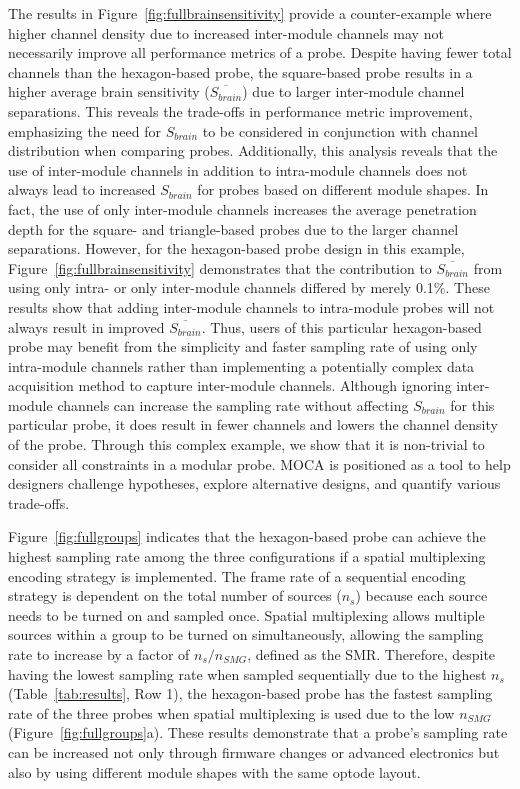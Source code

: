 The results in Figure~\ref{fig:fullbrainsensitivity} provide a counter-example where higher channel density due to increased inter-module channels may not necessarily improve all performance metrics of a probe. Despite having fewer total channels than the hexagon-based probe, the square-based probe results in a higher average brain sensitivity ($\overline{S_{brain}}$) due to larger inter-module channel separations. This reveals the trade-offs in performance metric improvement, emphasizing the need for $S_{brain}$ to be considered in conjunction with channel distribution when comparing probes. Additionally, this analysis reveals that the use of inter-module channels in addition to intra-module channels does not always lead to increased $S_{brain}$ for probes based on different module shapes. In fact, the use of only inter-module channels increases the average penetration depth for the square- and triangle-based probes due to the larger channel separations. However, for the hexagon-based probe design in this example, Figure~\ref{fig:fullbrainsensitivity} demonstrates that the contribution to $\overline{S_{brain}}$ from using only intra- or only inter-module channels differed by merely 0.1\%. These results show that adding inter-module channels to intra-module probes will not always result in improved $\overline{S_{brain}}$. Thus, users of this particular hexagon-based probe may benefit from the simplicity and faster sampling rate of using only intra-module channels rather than implementing a potentially complex data acquisition method to capture inter-module channels. Although ignoring inter-module channels can increase the sampling rate without affecting $S_{brain}$ for this particular probe, it does result in fewer channels and lowers the channel density of the probe. Through this complex example, we show that it is non-trivial to consider all constraints in a modular probe. \ac{MOCA} is positioned as a tool to help designers challenge hypotheses, explore alternative designs, and quantify various trade-offs.

Figure~\ref{fig:fullgroups} indicates that the hexagon-based probe can achieve the highest sampling rate among the three configurations if a spatial multiplexing encoding strategy is implemented. The frame rate of a sequential encoding strategy is dependent on the total number of sources ($n_s$) because each source needs to be turned on and sampled once. Spatial multiplexing allows multiple sources within a group to be turned on simultaneously, allowing the sampling rate to increase by a factor of $n_s/n_{SMG}$, defined as the \ac{SMR}. Therefore, despite having the lowest sampling rate when sampled sequentially due to the highest $n_s$ (Table~\ref{tab:results}, Row 1), the hexagon-based probe has the fastest sampling rate of the three probes when spatial multiplexing is used due to the low $n_{SMG}$ (Figure~\ref{fig:fullgroups}a). These results demonstrate that a probe's sampling rate can be increased not only through firmware changes or advanced electronics but also by using different module shapes with the same optode layout.

